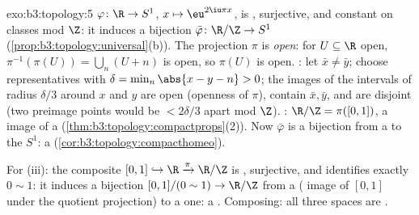 \begin{solution}{exo:b3:topology:5}
$\varphi \colon \R \to S^1$, $x \mapsto \eu^{2\iu\pi x}$, is
, surjective, and constant on classes mod $\Z$: it
induces a  bijection $\bar\varphi \colon \R/\Z \to
S^1$ (\cref{prop:b3:topology:universal}(b)). The projection
$\pi$ is \emph{open}: for $U \subseteq \R$ open,
$\pi^{-1}(\pi(U)) = \bigcup_{n}(U + n)$ is open, so $\pi(U)$ is
open. : let $\bar x \neq \bar y$; choose
representatives with $\delta = \min_{n}\abs{x - y - n} > 0$;
the images of the intervals of radius $\delta/3$ around $x$ and
$y$ are open (openness of $\pi$), contain $\bar x, \bar y$, and
are disjoint (two preimage points would be $< 2\delta/3$ apart
mod $\Z$). : $\R/\Z = \pi([0,1])$, a  image of
a  (\cref{thm:b3:topology:compactprops}(2)). Now
$\bar\varphi$ is a  bijection from a  to
the  $S^1$: a 
(\cref{cor:b3:topology:compacthomeo}).

For (iii): the composite $[0,1] \hookrightarrow \R
\xrightarrow{\pi} \R/\Z$ is , surjective, and
identifies exactly $0 \sim 1$: it induces a  bijection
$[0,1]/(0\sim1) \to \R/\Z$ from a  (
image of $[0,1]$ under the quotient projection) to a 
one: a . Composing: all three spaces are
.
\end{solution}

